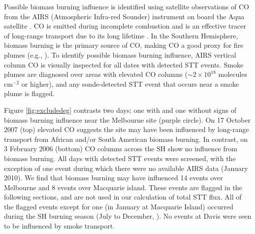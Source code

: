 \documentclass[acp, manuscript]{copernicus} %
\begin{document}
    Possible biomass burning influence is identified using satellite observations of CO from the AIRS (Atmospheric Infra-red Sounder) instrument on board the Aqua satellite \citep{AIRS3STD}.
    CO is emitted during incomplete combustion and is an effective tracer of long-range transport due to its long lifetime \citep{Edwards2003, Edwards2006}.
    In the Southern Hemisphere, biomass burning is the primary source of CO, making CO a good proxy for fire plumes (e.g., \citet{Sinha2004, Mari2008}).
    To identify possible biomass burning influence, AIRS vertical column CO is visually inspected for all dates with detected STT events.
    Smoke plumes are diagnosed over areas with elevated CO columns ($\sim 2 \times 10^{18}$ molecules cm$^{-2}$ or higher), and any sonde-detected STT event that occurs near a smoke plume is flagged.

    Figure \ref{fig:excludedeg} contrasts two days; one with and one without signs of biomass burning influence near the Melbourne site (purple circle).
    On 17 October 2007 (top) elevated CO suggests the site may have been influenced by long-range transport from African and/or South American biomass burning.
    In contrast, on 3 February 2006 (bottom) CO columns across the SH show no influence from biomass burning.
    All days with detected STT events were screened, with the exception of one event during which there were no available AIRS data (January 2010).
    We find that biomass burning may have influenced 14 events over Melbourne and 8 events over Macquarie island.
    These events are flagged in the following sections, and are not used in our calculation of total STT flux.
    All of the flagged events except for one (in January at Macquarie Island) occurred during the SH burning season (July to December, \citet{Edwards2006}). %
    No events at Davis were seen to be influenced by smoke transport.
    
\end{document}
